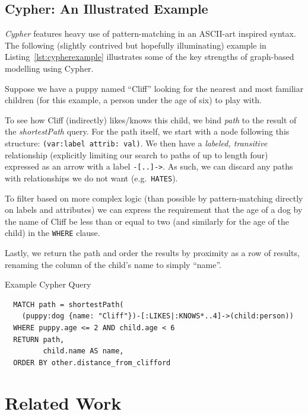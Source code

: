 \subsection{Cypher: An Illustrated Example}

\emph{Cypher} features heavy use of pattern-matching in an ASCII-art inspired
syntax.  The following (slightly contrived but hopefully illuminating) example
in Listing~\ref{lst:cypherexample} illustrates some of the key strengths of
graph-based modelling using Cypher. 

Suppose we have a puppy named ``Cliff'' looking for the nearest and most
familiar children (for this example, a person under the age of six) to play
with.

To see how Cliff (indirectly) likes/knows this child, we bind \emph{path} to the
result of the \emph{shortestPath} query.  For the path itself, we start with a
node following this structure: \texttt{(var:label {attrib: val})}.
We then have a \emph{labeled, transitive} relationship (explicitly limiting our
search to paths of up to length four) expressed as an arrow with a label
\texttt{-[..]->}. As such, we can discard any paths with relationships we do not
want (e.g.\ \texttt{HATES}). 

To filter based on more complex logic (than possible by pattern-matching directly
on labels and attributes) we can express the requirement that the age of a dog by
the name of Cliff be less than or equal to two (and similarly for the age of the
child) in the \texttt{WHERE} clause.

Lastly, we return the path and order the results by proximity as a row of
results, renaming the column of the child's name to simply ``name''.

\begin{listing}[tb]%

\caption{Example Cypher Query}\label{lst:cypherexample}

  \begin{verbatim}
  MATCH path = shortestPath(
    (puppy:dog {name: "Cliff"})-[:LIKES|:KNOWS*..4]->(child:person))
  WHERE puppy.age <= 2 AND child.age < 6
  RETURN path,
         child.name AS name,
  ORDER BY other.distance_from_clifford
  \end{verbatim}

\end{listing}

\section{Related Work}

